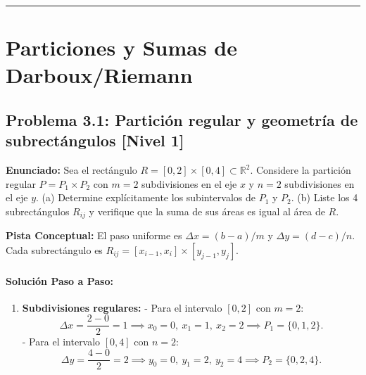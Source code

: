\documentclass[11pt,a4paper]{article}
\begin{document}
\vspace{0.5cm}
\hrule
\vspace{0.5cm}

\section{Particiones y Sumas de Darboux/Riemann}

\subsection*{Problema 3.1: Partición regular y geometría de subrectángulos \hfill \color{primaryblue}\small[Nivel 1]}

\begin{tcolorbox}[colback=white,colframe=gray!40,arc=1mm,boxrule=0.5pt,left=3mm,right=3mm,top=2mm,bottom=2mm]
\textbf{Enunciado:} Sea el rectángulo $R = [0, 2] \times [0, 4] \subset \mathbb{R}^2$. Considere la partición regular $P = P_1 \times P_2$ con $m = 2$ subdivisiones en el eje $x$ y $n = 2$ subdivisiones en el eje $y$. (a) Determine explícitamente los subintervalos de $P_1$ y $P_2$. (b) Liste los 4 subrectángulos $R_{ij}$ y verifique que la suma de sus áreas es igual al área de $R$.
\end{tcolorbox}

\begin{tcolorbox}[colback=yellow!4,colframe=accentamber!70,arc=1mm,boxrule=0.5pt,left=3mm,right=3mm,top=1.5mm,bottom=1.5mm]
\textbf{Pista Conceptual:} El paso uniforme es $\Delta x = (b-a)/m$ y $\Delta y = (d-c)/n$. Cada subrectángulo es $R_{ij} = [x_{i-1}, x_i] \times [y_{j-1}, y_j]$.
\end{tcolorbox}

\paragraph{Solución Paso a Paso:}\par
\begin{enumerate}[label=\textbf{\arabic*.}]
\item \textbf{Subdivisiones regulares:}
- Para el intervalo $[0, 2]$ con $m = 2$:
\begin{equation*}
\Delta x = \frac{2 - 0}{2} = 1 \implies x_0 = 0, \ x_1 = 1, \ x_2 = 2 \implies P_1 = \{0, 1, 2\}.
\end{equation*}
- Para el intervalo $[0, 4]$ con $n = 2$:
\begin{equation*}
\Delta y = \frac{4 - 0}{2} = 2 \implies y_0 = 0, \ y_1 = 2, \ y_2 = 4 \implies P_2 = \{0, 2, 4\}.
\end{equation*}
\end{enumerate}
\end{document}
